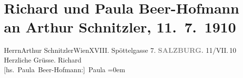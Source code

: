 

         \renewcommand{\erwaehnteOrte}{Orte: Edmund-Weiß-Gasse, Salzburg, Wien}
         \renewcommand{\erwaehnteWerke}{}
               \section[Richard und Paula Beer-Hofmann an Arthur Schnitzler, 11. 7. 1910]{ Richard und Paula Beer-Hofmann an Arthur Schnitzler,
               11. 7. 1910}\nopagebreak{}\rehead{ }\begin{ledgroupsized}[t]{13cm}\normalsize\beginnumbering \toendnotes[C]{\smallbreak\pagebreak[2]} 
\pstart{}{\pb}Herrn\pend{}\pstart{}Arthur Schnitzler\pend{}\pstart{}Wien\pend{}\pstart{}XVIII. Spöttelgasse 7.\pend{}{\bigskip}\pstart
           \noindent{}\centering{}{\pb}\textcolor{gray}{\textbf{SALZBURG.}}\pend
           \pstart
           \raggedleft{}{\pb}11/VII. 10\pend
           \pstart
           Herzliche Grüsse.\pend
           \pstart
           \spacefill\mbox{Richard}{\\[\baselineskip]}\spacefill\mbox{{[}hs. Paula Beer-Hofmann:{]} Paula}\pend
           \leftskip=0em{}
         
         \endnumbering{}\end{ledgroupsized}  \newcommand{\dateiname}{L01944}\newcommand{\titel}{Richard und Paula Beer-Hofmann an Arthur Schnitzler, 11. 7. 1910}\newcommand{\editorInnen}{Martin Anton Müller und Gerd-Hermann Susen}
      